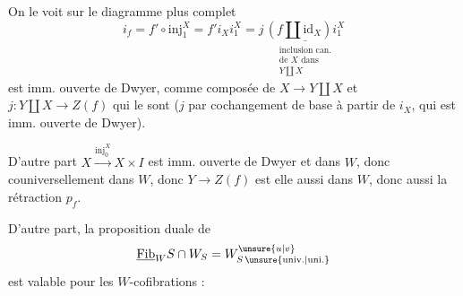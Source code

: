 On le voit sur le diagramme plus complet
\[
i_f=f'\circ\mathrm{inj}_1^X=f'i_Xi_1^X
=j\,\underset{\substack{\text{inclusion can.}\\\text{de }X\text{ dans}\\Y\amalg X}}{\underline{(f\amalg\mathrm{id}_X)i_1^X}}
\]
est imm. ouverte de Dwyer, comme composée de $X\longrightarrow Y\amalg X$ et $j:Y\amalg X\longrightarrow Z(f)$ qui le sont ($j$  par cochangement de base à partir de $i_X$, qui est imm. ouverte de Dwyer).

 D'autre part $X\xrightarrow{\mathrm{inj}_0^X}X\times I$ est imm. ouverte de Dwyer et dans $W$, donc couniversellement dans $W$, donc $Y\longrightarrow Z(f)$ est elle aussi dans $W$, donc aussi la rétraction $p_f$.

D'autre part, la proposition duale de
\[
\underline{\mathrm{Fib}}_W S\cap W_S=W^{\unsure{u|v}}_{S\,\unsure{\mathrm{univ.}|\mathrm{uni.}}}
\]
est valable pour les $W$-cofibrations :
